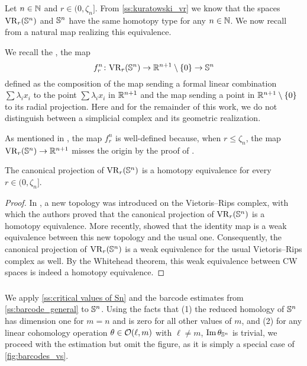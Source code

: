\subsubsection{}\label{ss:VRSn projection}

Let \(n \in \mathbb{N}\) and \(r \in (0, \zeta_n]\).
From \cref{ss:kuratowski_vr} we know that the spaces \(\mathrm{VR}_r(\mathbb{S}^n)\) and \(\mathbb{S}^n\) have the same homotopy type for any \(n \in \mathbb{N}\).
We now recall from \cite{adamaszek2020homotopy} a natural map realizing this equivalence.

We recall the , the map
\[
f_r^n \colon \mathrm{VR}_r(\mathbb{S}^n) \to \mathbb{R}^{n+1} \setminus \{0\} \to \mathbb{S}^n
\]
defined as the composition of the map sending a formal linear combination $\sum\lambda_i x_i$ to the point \(\sum\lambda_i x_i\) in \(\mathbb{R}^{n+1}\) and the map sending a point in \(\mathbb{R}^{n+1} \setminus \{0\}\) to its radial projection.
Here and for the remainder of this work, we do not distinguish between a simplicial complex and its geometric realization.

As mentioned in \cite{adamaszek2018metric}, the map $f_r^n$ is well-defined because, when $r \leq \zeta_n$, the map $\mathrm{VR}_r(\mathbb{S}^n) \to \mathbb{R}^{n+1}$ misses the origin by the proof of \cite[Lemma 3]{lovasz1983self}.

\lemma
The canonical projection of \(\mathrm{VR}_r(\mathbb{S}^n)\) is a homotopy equivalence for every $r \in (0, \zeta_n]$.

\begin{proof}
    In \cite{adamaszek2018metric}, a new topology was introduced on the Vietoris--Rips complex, with which the authors proved that the canonical projection of \(\mathrm{VR}_r(\mathbb{S}^n)\) is a homotopy equivalence.
    More recently, \cite{gillespie2024vietoris} showed that the identity map is a weak equivalence between this new topology and the usual one.
    Consequently, the canonical projection of \(\mathrm{VR}_r(\mathbb{S}^n)\) is a weak equivalence for the usual Vietoris--Rips complex as well.
    By the Whitehead theorem, this weak equivalence between CW spaces is indeed a homotopy equivalence.
\end{proof}

\subsubsection{}\label{ss:barcode_Sn}

We apply \cref{ss:critical values of Sn} and the barcode estimates from \cref{ss:barcode_general} to \(\mathbb{S}^n\).
Using the facts that (1) the reduced homology of \(\mathbb{S}^n\) has dimension one for \(m = n\) and is zero for all other values of \(m\), and (2) for any linear cohomology operation \(\theta \in \mathcal{O}(\ell, m)\) with \(\ell \neq m\), \(\operatorname{Im} \theta_{\mathbb{S}^n}\) is trivial, we proceed with the estimation but omit the figure, as it is simply a special case of \cref{fig:barcodes_vs}.

